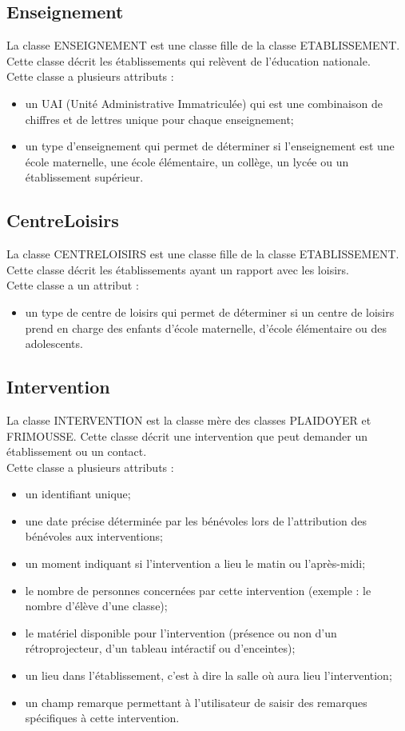 \documentclass[asi, sansVersion]{picInsa}
\begin{document}
\subsection*{Enseignement}
La classe ENSEIGNEMENT est une classe fille de la classe ETABLISSEMENT. Cette classe décrit les établissements qui relèvent de l'éducation nationale. \\
Cette classe a plusieurs attributs : 
\begin{itemize}
\item un UAI (Unité Administrative Immatriculée) qui est une combinaison de chiffres et de lettres unique pour chaque enseignement;
\item un type d'enseignement qui permet de déterminer si l'enseignement est une école maternelle, une école élémentaire, un collège, un lycée ou un établissement supérieur. 
\end{itemize} 


\subsection*{CentreLoisirs}
La classe CENTRELOISIRS est une classe fille de la classe ETABLISSEMENT. Cette classe décrit les établissements ayant un rapport avec les loisirs. \\
Cette classe a un attribut : 
\begin{itemize}
\item un type de centre de loisirs qui permet de déterminer si un centre de loisirs prend en charge des enfants d'école maternelle, d'école élémentaire ou des adolescents.
\end{itemize}  

\subsection*{Intervention}
La classe INTERVENTION est la classe mère des classes PLAIDOYER et FRIMOUSSE. Cette classe décrit une intervention que peut demander un établissement ou un contact. \\
Cette classe a plusieurs attributs :
\begin{itemize}
\item un identifiant unique;
\item une date précise déterminée par les bénévoles lors de l'attribution des bénévoles aux interventions;
\item un moment indiquant si l'intervention a lieu le matin ou l'après-midi;
\item le nombre de personnes concernées par cette intervention (exemple : le nombre d'élève d'une classe);
\item le matériel disponible pour l'intervention (présence ou non d'un rétroprojecteur, d'un tableau intéractif ou d'enceintes);
\item un lieu dans l'établissement, c'est à dire la salle où aura lieu l'intervention;
\item un champ remarque permettant à l'utilisateur de saisir des remarques spécifiques à cette intervention. 
\end{itemize}
\end{document}
